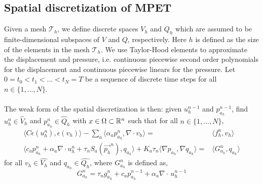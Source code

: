 \subsection{Spatial discretization of MPET}
Given a mesh $\mathcal{T}_h$, we define discrete spaces $V_h$ and $Q_h$ which are assumed to be finite-dimensional subspaces of $V$ and $Q$, respectively. Here $h$ is defined as the size of the elements in the mesh $\mathcal{T}_h$. We use Taylor-Hood elements to approximate the displacement and pressure, i.e. continuous piecewise second order polynomials for the displacement and continuous piecewise linears for the pressure. Let $0 = t_0 < t_1 <...< t_N = T$ be a sequence of discrete time steps for all $n\in\{1,..., N \}$.  
\\
\\
The weak form of the spatial discretization is then: given $u_h^{n-1}$ and $p_{a_h}^{n-1}$, find $u_h^n \in \hat{V}_h$ and $p_{a_h}^n \in \hat{Q}_h$ with $x\in \Omega \subset \mathbb{R}^n$ such that for all $n\in\{1,..., N \}$,
\begin{align} \label{mpet_fem1}
\langle C \epsilon(u_h^n), \epsilon(v_h) \rangle - \sum_a \langle \alpha_a p_{a_h}^n ,\nabla \cdot v_h \rangle = & \langle f_h^n , v_h \rangle  \\
\langle c_a p_{a_h}^{n} + \alpha_a \nabla \cdot u_h^n + \tau_n S_a(\vec{p_h}^n),  q_{a_h} \rangle + K_a \tau_n \langle \nabla p_{a_h}, \nabla q_{a_h}\rangle = & \langle G_{a_h}^n, q_{a_h}\rangle  \label{mpet_fem2}
\end{align}
for all $v_h \in \hat{V_h}$ and $q_{a_h} \in \hat{Q_h}$, where $G_{a_h}^n$ is defined as,
\begin{equation} \label{Gh_source}
G_{a_h}^n = \tau_n g_{a_h}^n + c_a p_{a_h}^{n-1} + \alpha_a \nabla \cdot \, u_h^{n-1}
\end{equation}
